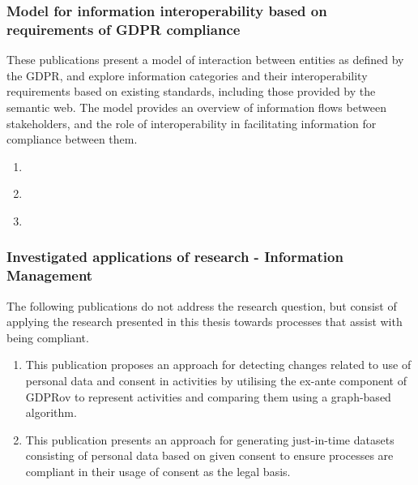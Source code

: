 \subsubsection{Model for information interoperability based on requirements of GDPR compliance}
These publications present a model of interaction between entities as defined by the GDPR, and explore information categories and their interoperability requirements based on existing standards, including those provided by the semantic web.
The model provides an overview of information flows between stakeholders, and the role of interoperability in facilitating information for compliance between them.
\begin{enumerate}[resume]
    \item \textbf{}
    \item \textbf{}
    \item {}
\end{enumerate}

\subsubsection{Investigated applications of research - Information Management}
The following publications do not address the research question, but consist of applying the research presented in this thesis towards processes that assist with being compliant.
\begin{enumerate}[resume]
    \item \textbf{}
    \newline This publication proposes an approach for detecting changes related to use of personal data and consent in activities by utilising the ex-ante component of GDPRov to represent activities and comparing them using a graph-based algorithm.
    \item \textbf{}
    \newline This publication presents an approach for generating just-in-time datasets consisting of personal data based on given consent to ensure processes are compliant in their usage of consent as the legal basis.
\end{enumerate}

